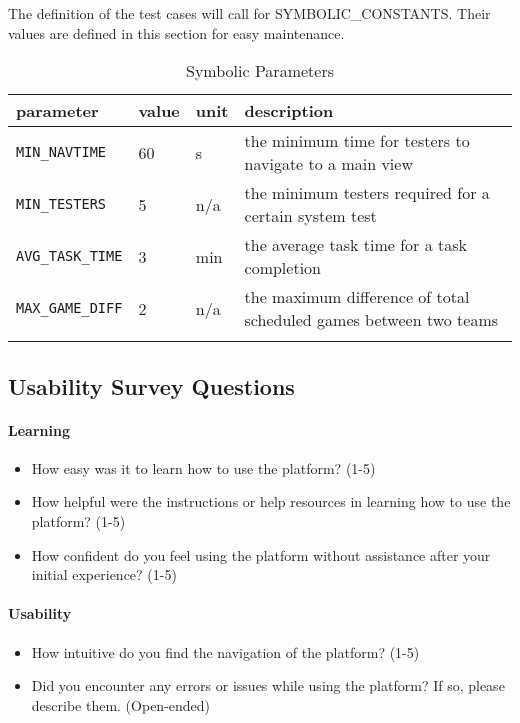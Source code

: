 \documentclass[12pt, titlepage]{article}
\begin{document}
The definition of the test cases will call for SYMBOLIC\_CONSTANTS.
Their values are defined in this section for easy maintenance.
\begin{longtable}{|l|l|l|p{5cm}|}

    \hline
    parameter                                     & value & unit & description                                                       \\
    \hline
    \texttt{MIN\_NAVTIME}\label{MIN_NAVTIME}      & 60    & s    & the minimum time for testers to navigate to a main view           \\
    \hline
    \texttt{MIN\_TESTERS}\label{MIN_TESTERS}      & 5     & n/a  & the minimum testers required for a certain system test            \\
    \hline
    \texttt{AVG\_TASK\_TIME}\label{AVG_TASK_TIME} & 3     & min  & the average task time for a task completion                       \\
    \hline
    \texttt{MAX\_GAME\_DIFF}\label{MAX_GAME_DIFF} & 2     & n/a  & the maximum difference of total scheduled games between two teams \\
    \hline
	\caption{Symbolic Parameters}
\end{longtable}

\subsection{Usability Survey Questions}

\paragraph{Learning}
\begin{itemize}
    \item{How easy was it to learn how to use the platform? (1-5)}
    \item{How helpful were the instructions or help resources in learning how to use the platform? (1-5)}
    \item{How confident do you feel using the platform without assistance after your initial experience? (1-5)}
\end{itemize}

\paragraph{Usability}
\begin{itemize}
    \item{How intuitive do you find the navigation of the platform? (1-5)}
    \item{Did you encounter any errors or issues while using the platform? If so, please describe them. (Open-ended)}
\end{itemize}
\end{document}
